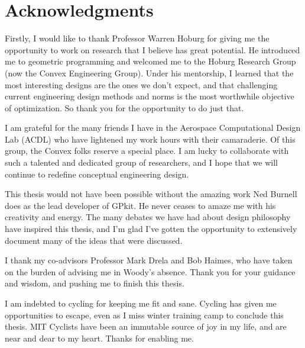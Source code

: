 % 

\cleardoublepage

\section*{Acknowledgments}

Firstly, I would like to thank Professor Warren Hoburg for giving me
the opportunity to work on research that I believe has great potential.
He introduced me to geometric programming and welcomed me to the Hoburg Research Group
(now the Convex Engineering Group). Under his mentorship, I learned that the most interesting designs
are the ones we don't expect, and that challenging current engineering design methods and norms
is the most worthwhile objective of optimization.
So thank you for the opportunity to do just that.

I am grateful for the many friends I have in the Aerospace Computational Design
Lab (ACDL) who have lightened my work hours with their camaraderie. Of this group,
the Convex folks reserve a special place. I am lucky to collaborate with
such a talented and dedicated group of researchers, and I hope that we will continue
to redefine conceptual engineering design.

This thesis would not have been possible without the amazing work Ned Burnell does
as the lead developer of GPkit. He never ceases to amaze me with his creativity and energy.
The many debates we have had about design philosophy have inspired this thesis,
and I'm glad I've gotten the opportunity to extensively document many of the ideas
that were discussed.

I thank my co-advisors Professor Mark Drela and Bob Haimes, who have taken on the burden of advising
me in Woody's absence. Thank you for your guidance and wisdom, and pushing me to
finish this thesis.

I am indebted to cycling for keeping me fit and sane. Cycling has given me opportunities to
escape, even as I miss winter training camp to conclude this thesis.
MIT Cyclists have been an immutable source of joy in my life, and are near and dear
to my heart. Thanks for enabling me.

